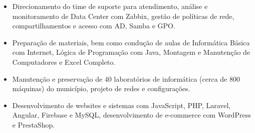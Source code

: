 \documentclass[10pt,a4paper,ragged2e]{altacv}
\begin{document}
\begin{itemize}
  \item Direcionamento do time de suporte para atendimento, análise e monitoramento de Data Center com Zabbix, gestão de políticas de rede, compartilhamentos e acesso com AD, Samba e GPO.
\end{itemize}

\vspace{10px}

\begin{itemize}
  \item Preparação de materiais, bem como condução de aulas de Informática Básica com Internet, Lógica de Programação com Java, Montagem e Manutenção de Computadores e Excel Completo.
\end{itemize}

\vspace{10px}

\begin{itemize}
  \item Manutenção e preservação de 40 laboratórios de informática (cerca de 800 máquinas) do município, projeto de redes e configurações.
\end{itemize}

\vspace{10px}

\begin{itemize}
  \item Desenvolvimento de websites e sistemas com JavaScript, PHP, Laravel, Angular, Firebase e MySQL, desenvolvimento de e-commerce com WordPress e PrestaShop.
\end{itemize}

\vspace{10px}



\clearpage
\end{document}
